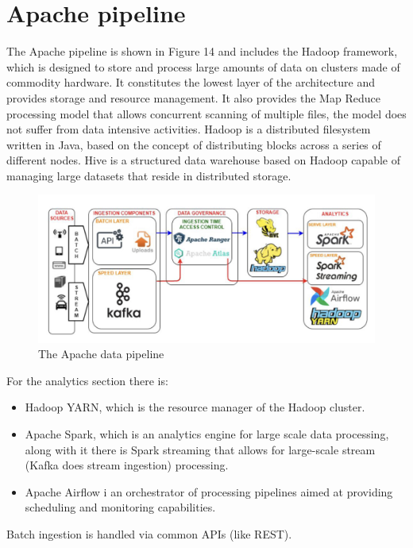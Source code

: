 \section{Apache pipeline}
The Apache pipeline is shown in Figure 14 and includes the Hadoop framework, which is designed to store and process large amounts of data on clusters made of commodity hardware. It constitutes the lowest layer of the architecture and provides storage and resource management. \n
It also provides the Map Reduce processing model that allows concurrent scanning of multiple files, the model does not suffer from data intensive activities. \n
Hadoop is a distributed filesystem written in Java, based on the concept of distributing blocks across a series of different nodes. Hive is a structured data warehouse based on Hadoop capable of managing large datasets that reside in distributed storage.
\begin{figure}
    \centering
    \includegraphics[scale=0.2]{img/apache_architecture.jpeg}
    \caption{The Apache data pipeline}
\end{figure}
For the analytics section there is:
\begin{itemize}
    \item Hadoop YARN, which is the resource manager of the Hadoop cluster.
    \item Apache Spark, which is an analytics engine for large scale data processing, along with it there is Spark streaming that allows for large-scale stream (Kafka does stream ingestion) processing.
    \item Apache Airflow i an orchestrator of processing pipelines aimed at providing scheduling and monitoring capabilities.
\end{itemize}
Batch ingestion is handled via common APIs (like REST).
